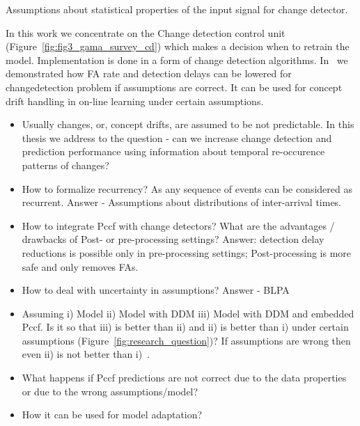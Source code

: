 Assumptions about statistical properties of the input signal for change detector. 

In this work we concentrate on the Change detection control unit (Figure~\ref{fig:fig3_gama_survey_cd}) which makes a decision when to retrain the model.
Implementation is done in a form of change detection algorithms.
In~\cite{XXX} we demonstrated how FA rate and detection delays can be lowered for changedetection problem if assumptions are correct.
It can be used for concept drift handling in on-line learning under certain assumptions.

\begin{itemize}

  \item Usually changes, or, concept drifts, are assumed to be not predictable. In this thesis we address to the question - can we increase change detection and prediction performance using information about temporal re-occurence patterns of changes? 

  \item How to formalize recurrency? As any sequence of events can be considered as recurrent. Answer - Assumptions about distributions of inter-arrival times.

  \item How to integrate Pccf with change detectors? What are the advantages / drawbacks of  Post- or pre-processing settings? Answer: detection delay reductions is possible only in pre-processing settings; Post-processing is more safe and only removes FAs.

  \item How to deal with uncertainty in assumptions? Answer - BLPA

  \item Assuming i) Model ii) Model with DDM iii) Model with DDM and embedded Pccf. Is it so that iii) is better than ii) and ii) is better than i) under certain assumptions (Figure~\ref{fig:research_question})? If assumptions are wrong then even ii) is not better than i)~\cite{SouzaRMB20}.

  \item What happens if Pccf predictions are not correct due to the data properties or due to the wrong assumptions/model? 

  \item How it can be used for model adaptation?

\end{itemize}

